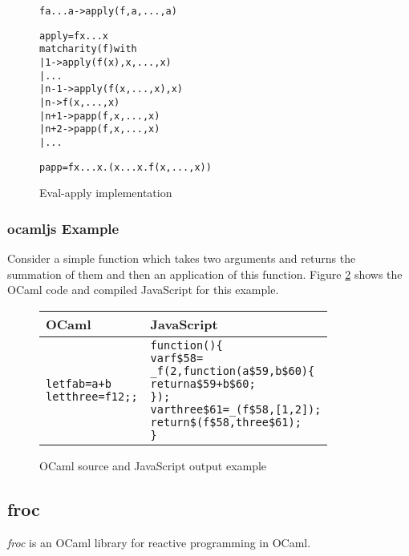 \begin{figure}
  \begin{alltt}
f a ... a -> apply(f, a, ..., a)

apply = \lam f x ... x
  match arity(f) with
    | 1   -> apply (f(x), x, ..., x)
    | ...
    | n-1 -> apply (f(x, ..., x), x)
    | n   -> f(x, ..., x)
    | n+1 -> papp(f, x, ..., x)
    | n+2 -> papp(f, x, ..., x)
    | ...

papp = \lam f x ... x. (\lam x ... x. f(x, ..., x))
  \end{alltt}
  \caption{Eval-apply implementation}
  \label{eval-apply}
\end{figure}

\subsubsection{ocamljs Example}
Consider a simple function which takes two arguments and returns the summation of them and then an application of this function. Figure \ref{example} shows the OCaml code and compiled JavaScript for this example.

\begin{figure}
  \begin{tabular}{| p{4cm} | p{7.3cm} |}
    \hline
    \textbf{OCaml} & \textbf{JavaScript}\\ \hline
    \begin{alltt}
let f a b = a+b
let three = f 1 2;;
    \end{alltt}
    &
    \begin{alltt}
function () \{
  var f\$58 =
    _f(2, function (a\$59, b\$60) \{
      return a\$59 + b\$60;
    \});
  var three\$61 = _(f\$58, [ 1, 2 ]);
  return \$(f\$58, three\$61);
\}
    \end{alltt} \\ \hline
  \end{tabular}
  \caption{OCaml source and JavaScript output example}
  \label{example}
\end{figure}

\subsection{froc}

\emph{froc} is an OCaml library for reactive programming in OCaml.

